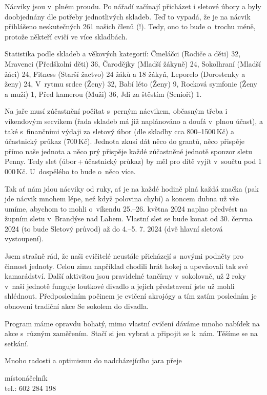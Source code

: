 \documentclass[11pt]{article}
\begin{document}
Nácviky jsou v~plném proudu. Po nářadí začínají přicházet i sletové úbory a byly doobjednány dle potřeby jednotlivých skladeb. Teď to vypadá, že je na nácvik přihlášeno neskutečných 261 našich členů (!). Tedy, ono to bude o~trochu méně, protože někteří cvičí ve více skladbách.

Statistika podle skladeb a věkových kategorií: Čmeláčci (Rodiče a děti) 32, Mravenci (Předškolní děti) 36, Čarodějky (Mladší žákyně) 24, Sokolhraní (Mladší žáci) 24, Fitness (Starší žactvo) 24 žáků a 18 žákyň, Leporelo (Dorostenky a ženy) 24, V~rytmu srdce (Ženy) 32, Babí léto (Ženy) 9, Rocková symfonie (Ženy a muži) 1, Před kamerou (Muži) 36, Jdi za štěstím (Senioři) 1.

Na jaře musí zúčastnění počítat s~perným nácvikem, občasným třeba i víkendovým secvikem (řada skladeb má již naplánováno a doufá v~plnou účast), a také s~finančními výdaji za sletový úbor (dle skladby cca 800–1500\,Kč) a účastnický průkaz (700\,Kč). Jednota zkusí dát něco do grantů, něco přispěje přímo naše jednota a něco prý přispěje každé zúčastněné jednotě sponzor sletu Penny. Tedy slet (úbor\,+\,účastnický průkaz) by měl pro dítě vyjít v~součtu pod 1 000\,Kč. U~dospělého to bude o~něco více.  

Tak ať nám jdou nácviky od ruky, ať je na každé hodině plná každá značka (pak jde nácvik mnohem lépe, než když polovina chybí) a koncem dubna už vše umíme, abychom to mohli o~víkendu 25.–⁠⁠⁠⁠⁠26. května 2024 naplno předvést na župním sletu v~Brandýse nad Labem. Vlastní slet se bude konat od 30. června 2024 (to bude Sletový průvod) až do 4.–⁠⁠⁠⁠⁠5. 7. 2024 (dvě hlavní sletová vystoupení).

\clearpage
\vspace*{-48pt}
Jsem strašně rád, že naši cvičitelé neustále přicházejí s~novými podněty pro činnost jednoty. Celou zimu například chodili hrát hokej a upevňovali tak své kamarádství. Další aktivitou jsou pravidelné tančírny v~sokolovně, už 2 roky v~naší jednotě funguje loutkové divadlo a jejich představení jste už mohli shlédnout. Předposledním počinem je cvičení akrojógy a tím zatím posledním je obnovení tradiční akce Se sokolem do divadla.

Program máme opravdu bohatý, mimo vlastní cvičení dáváme mnoho nabídek na akce s~různým zaměřením. Stačí si jen vybrat a připojit se k~nám. Těšíme se na setkání.

Mnoho radosti a optimismu do nadcházejícího jara přeje

\signature{Jiří Novák (Jirkan)}{místonáčelník\\tel.: 602 284 198}
\end{document}

